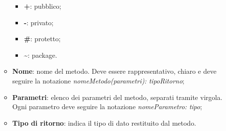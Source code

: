 \begin{enumerate}
\begin{itemize}
\begin{itemize}
			            \item \textbf{+}: pubblico;
			            \item \textbf{-}: privato;
			            \item \textbf{\#}: protetto;
			            \item \textbf{\textasciitilde}: package.
		            \end{itemize}
		      \item \textbf{Nome}: nome del metodo. Deve essere rappresentativo, chiaro e deve seguire la notazione \textit{nomeMetodo(parametri): tipoRitorno};
		      \item \textbf{Parametri}: elenco dei parametri del metodo, separati tramite virgola. Ogni parametro deve seguire la notazione \textit{nomeParametro: tipo};
		      \item \textbf{Tipo di ritorno}: indica il tipo di dato restituito dal metodo.
	      \end{itemize}
\end{enumerate}

